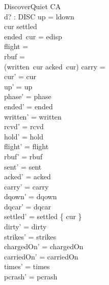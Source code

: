 \documentclass[a4paper,10pt,fleqn]{article}
\begin{document}
\begin{schema}{DiscoverQuiet}
  \Delta CA \\
  d? : DISC
\where
  up = ldown \\
  cur \notin settled \\
  ended~cur = edisp \\
  flight = \emptyset \\
  rbuf = \emptyset \\
  (written~cur \setminus acked~cur) \cup carry = \emptyset \\
  cur' = cur \\
  up' = up \\
  phase' = phase \\
  ended' = ended \\
  written' = written \\
  rcvd' = rcvd \\
  hold' = hold \\
  flight' = flight \\
  rbuf' = rbuf \\
  sent' = sent \\
  acked' = acked \\
  carry' = carry \\
  dqown' = dqown \\
  dqcar' = dqcar \\
  settled' = settled \cup \{ cur \} \\
  dirty' = dirty \\
  strikes' = strikes \\
  chargedOn' = chargedOn \\
  carriedOn' = carriedOn \\
  times' = times \\
  pcrash' = pcrash
\end{schema}
\end{document}
